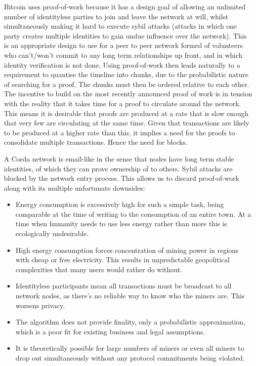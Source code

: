 \documentclass{article}
\begin{document}
Bitcoin uses proof-of-work because it has a design goal of allowing an unlimited number of identityless parties to join
and leave the network at will, whilst simultaneously making it hard to execute sybil attacks (attacks in which one party
creates multiple identities to gain undue influence over the network). This is an appropriate design to use for a peer to
peer network formed of volunteers who can't/won't commit to any long term relationships up front, and in which identity
verification is not done. Using proof-of-work then leads naturally to a requirement to quantise the timeline into chunks,
due to the probabilistic nature of searching for a proof. The chunks must then be ordered relative to each other.
The incentive to build on the most recently announced proof of work is in tension with the reality that it takes
time for a proof to circulate around the network. This means it is desirable that proofs are produced at a rate
that is slow enough that very few are circulating at the same time. Given that transactions are likely to be
produced at a higher rate than this, it implies a need for the proofs to consolidate multiple transactions.
Hence the need for blocks.

A Corda network is email-like in the sense that nodes have long term stable identities, of which they can prove ownership
of to others. Sybil attacks are blocked by the network entry process. This allows us to discard proof-of-work along with
its multiple unfortunate downsides:

\begin{itemize}
\item Energy consumption is excessively high for such a simple task, being comparable at the time of writing to the
consumption of an entire town. At a time when humanity needs to use less energy rather than more this is ecologically
undesirable.
\item High energy consumption forces concentration of mining power in regions with cheap or free electricity. This results
in unpredictable geopolitical complexities that many users would rather do without.
\item Identityless participants mean all transactions must be broadcast to all network nodes, as there's no reliable
way to know who the miners are. This worsens privacy.
\item The algorithm does not provide finality, only a probabilistic approximation, which is a poor fit for existing
business and legal assumptions.
\item It is theoretically possible for large numbers of miners or even all miners to drop out simultaneously without
any protocol commitments being violated.
\end{itemize}
\end{document}
